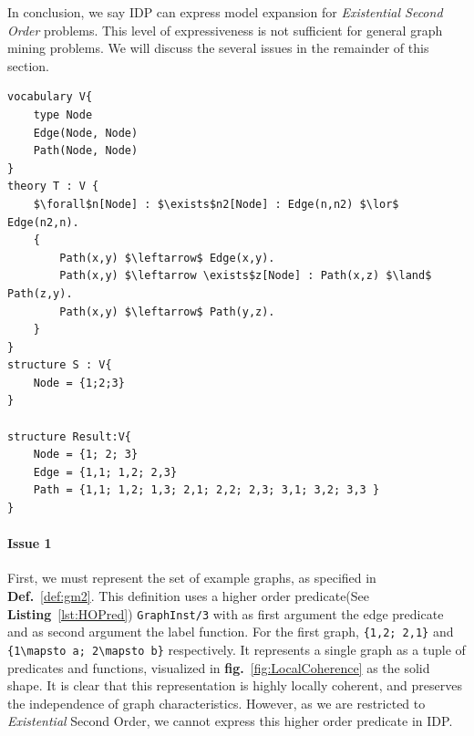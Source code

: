In conclusion, we say IDP can express model expansion for \emph{Existential Second Order} problems.
This level of expressiveness is not sufficient for general graph mining problems.
We will discuss the several issues in the remainder of this section.


\begin{lstlisting}[mathescape,style=model,caption=\ldots, label=lst:vocabularyExample]
vocabulary V{
    type Node
    Edge(Node, Node)
    Path(Node, Node)
}
theory T : V {
    $\forall$n[Node] : $\exists$n2[Node] : Edge(n,n2) $\lor$ Edge(n2,n).
    {
        Path(x,y) $\leftarrow$ Edge(x,y).
        Path(x,y) $\leftarrow \exists$z[Node] : Path(x,z) $\land$ Path(z,y).
        Path(x,y) $\leftarrow$ Path(y,z).
    }
}
structure S : V{
    Node = {1;2;3}
}

structure Result:V{
    Node = {1; 2; 3}
    Edge = {1,1; 1,2; 2,3}
    Path = {1,1; 1,2; 1,3; 2,1; 2,2; 2,3; 3,1; 3,2; 3,3 }
}
\end{lstlisting}


\paragraph{Issue 1}
First, we must represent the set of example graphs, as specified in \textbf{Def.}~\ref{def:gm2}. 
This definition uses a higher order predicate(See \textbf{Listing}~\ref{lst:HOPred}) \lstinline{GraphInst/3} with as first argument the edge predicate and as second argument the label function. For the first graph, \lstinline|{1,2; 2,1}| and \lstinline|{1\mapsto a; 2\mapsto b}| respectively. 
It represents a single graph as a tuple of predicates and functions, visualized in \textbf{fig.}~\ref{fig:LocalCoherence} as the solid shape.
It is clear that this representation is highly locally coherent, and preserves the independence of graph characteristics.
However, as we are restricted to \emph{Existential} Second Order, we cannot express this higher order predicate in IDP.

